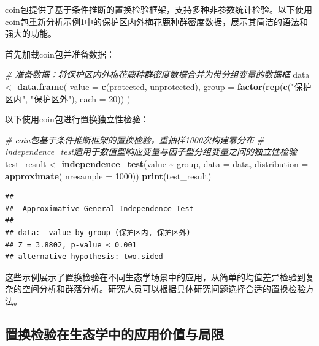 \documentclass[
  twoside,12pt,fontset=none]{ctexbook}
\newenvironment{Shaded}{\begin{snugshade}}{\end{snugshade}}
\newcommand{\AttributeTok}[1]{\textcolor[rgb]{0.13,0.29,0.53}{#1}}
\newcommand{\CommentTok}[1]{\textcolor[rgb]{0.56,0.35,0.01}{\textit{#1}}}
\newcommand{\DecValTok}[1]{\textcolor[rgb]{0.00,0.00,0.81}{#1}}
\newcommand{\FunctionTok}[1]{\textcolor[rgb]{0.13,0.29,0.53}{\textbf{#1}}}
\newcommand{\NormalTok}[1]{#1}
\newcommand{\OtherTok}[1]{\textcolor[rgb]{0.56,0.35,0.01}{#1}}
\newcommand{\SpecialCharTok}[1]{\textcolor[rgb]{0.81,0.36,0.00}{\textbf{#1}}}
\newcommand{\StringTok}[1]{\textcolor[rgb]{0.31,0.60,0.02}{#1}}
\begin{document}
coin包提供了基于条件推断的置换检验框架，支持多种非参数统计检验。以下使用coin包重新分析示例1中的保护区内外梅花鹿种群密度数据，展示其简洁的语法和强大的功能。

首先加载coin包并准备数据：

\begin{Shaded}
\begin{Highlighting}[]
\CommentTok{\# 准备数据：将保护区内外梅花鹿种群密度数据合并为带分组变量的数据框}
\NormalTok{data }\OtherTok{\textless{}{-}} \FunctionTok{data.frame}\NormalTok{(}
  \AttributeTok{value =} \FunctionTok{c}\NormalTok{(protected, unprotected),}
  \AttributeTok{group =} \FunctionTok{factor}\NormalTok{(}\FunctionTok{rep}\NormalTok{(}\FunctionTok{c}\NormalTok{(}\StringTok{"保护区内"}\NormalTok{, }\StringTok{"保护区外"}\NormalTok{), }\AttributeTok{each =} \DecValTok{20}\NormalTok{))}
\NormalTok{)}
\end{Highlighting}
\end{Shaded}

以下使用coin包进行置换独立性检验：

\begin{Shaded}
\begin{Highlighting}[]
\CommentTok{\# coin包基于条件推断框架的置换检验，重抽样1000次构建零分布}
\CommentTok{\# independence\_test适用于数值型响应变量与因子型分组变量之间的独立性检验}
\NormalTok{test\_result }\OtherTok{\textless{}{-}} \FunctionTok{independence\_test}\NormalTok{(value }\SpecialCharTok{\textasciitilde{}}\NormalTok{ group,}
                                \AttributeTok{data =}\NormalTok{ data,}
                                \AttributeTok{distribution =} \FunctionTok{approximate}\NormalTok{(}
                                  \AttributeTok{nresample =} \DecValTok{1000}\NormalTok{))}
\FunctionTok{print}\NormalTok{(test\_result)}
\end{Highlighting}
\end{Shaded}

\begin{verbatim}
## 
##  Approximative General Independence Test
## 
## data:  value by group (保护区内, 保护区外)
## Z = 3.8802, p-value < 0.001
## alternative hypothesis: two.sided
\end{verbatim}

这些示例展示了置换检验在不同生态学场景中的应用，从简单的均值差异检验到复杂的空间分析和群落分析。研究人员可以根据具体研究问题选择合适的置换检验方法。

\hypertarget{ux7f6eux6362ux68c0ux9a8cux5728ux751fux6001ux5b66ux4e2dux7684ux5e94ux7528ux4ef7ux503cux4e0eux5c40ux9650}{%
\subsection{置换检验在生态学中的应用价值与局限}\label{ux7f6eux6362ux68c0ux9a8cux5728ux751fux6001ux5b66ux4e2dux7684ux5e94ux7528ux4ef7ux503cux4e0eux5c40ux9650}}
\end{document}
